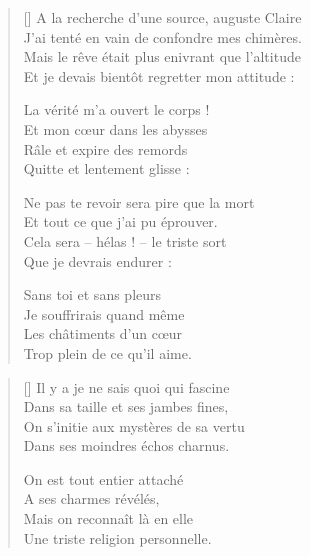 \newpage

\settowidth{\versewidth}{Mais le rêve était plus enivrant que l'altitude}
\begin{verse}[\versewidth]
A la recherche d'une source, auguste Claire \\
J'ai tenté en vain de confondre mes chimères. \\
Mais le rêve était plus enivrant que l'altitude \\
Et je devais bientôt regretter mon attitude :

La vérité m'a ouvert le corps ! \\
Et mon cœur dans les abysses \\
Râle et expire des remords \\
Quitte et lentement glisse :

Ne pas te revoir sera pire que la mort \\
Et tout ce que j'ai pu éprouver. \\
Cela sera -- hélas ! -- le triste sort \\
Que je devrais endurer :

Sans toi et sans pleurs \\
Je souffrirais quand même \\
Les châtiments d'un cœur \\
Trop plein de ce qu'il aime.
\end{verse}

\newpage

\settowidth{\versewidth}{On s'initie aux mystères de sa vertu}
\begin{verse}[\versewidth]
Il y a je ne sais quoi qui fascine \\
Dans sa taille et ses jambes fines, \\
On s'initie aux mystères de sa vertu \\
Dans ses moindres échos charnus.

On est tout entier attaché \\
A ses charmes révélés, \\
Mais on reconnaît là en elle \\
Une triste religion personnelle.
\end{verse}

